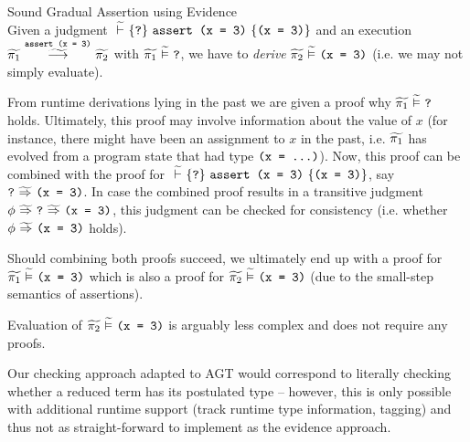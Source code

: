 \begin{example}{Sound Gradual Assertion using Evidence}\label{ex:snd-evidence}~\\
    Given a judgment $\gthoare{}{\qm}{\sAssert{\phiEq{x}{3}}}{\phiEq{x}{3}}$ and an execution $\gsstepConsume{\sAssert{\phiEq{x}{3}}}{\grad{\pi_1}}{\grad{\pi_2}}$ with $\evalgphiGen{\grad{\pi_1}}{\qm}$, we have to \emph{derive} $\evalgphiGen{\grad{\pi_2}}{\phiEq{x}{3}}$ (i.e. we may not simply evaluate).
    
    From runtime derivations lying in the past we are given a proof why $\evalgphiGen{\grad{\pi_1}}{\qm}$ holds.
    Ultimately, this proof may involve information about the value of $x$ (for instance, there might have been an assignment to $x$ in the past, i.e. $\grad{\pi_1}$ has evolved from a program state that had type $\phiEq{x}{...}$).
    Now, this proof can be combined with the proof for $\gthoare{}{\qm}{\sAssert{\phiEq{x}{3}}}{\phiEq{x}{3}}$, say $\gphiImplies{\qm}{\phiEq{x}{3}}$.
    In case the combined proof results in a transitive judgment $\gphiImplies{\phi}{\gphiImplies{\qm}{\phiEq{x}{3}}}$, this judgment can be checked for consistency (i.e. whether $\gphiImplies{\phi}{\phiEq{x}{3}}$ holds).
    
    Should combining both proofs succeed, we ultimately end up with a proof for $\evalgphiGen{\grad{\pi_1}}{\phiEq{x}{3}}$ which is also a proof for $\evalgphiGen{\grad{\pi_2}}{\phiEq{x}{3}}$ (due to the small-step semantics of assertions).
    
    Evaluation of $\evalgphiGen{\grad{\pi_2}}{\phiEq{x}{3}}$ is arguably less complex and does not require any proofs.
    \begin{comment}
    Note also that the assertion example above is a very simple case. In general, it might be required to show consistency of more complex proofs, e.g. by proving that $$\gphiImplies{\phiAnd{$(\phiAnd{$(\wo{\phi}{\eresult})$}{\phiEq{\eresult}{\ethis}})[\ttt{x},\ttt{y}/\eresult,\ethis]$}{\phiEq{x}{p}}}{\phiEq{y}{p}}$$
    holds given $$\gphiImplies{\phiAnd{$(\phiAnd{$(\wo{\phi}{\eresult})$}{\phiEq{\eresult}{\ethis}})[\ttt{x},\ttt{y}/\eresult,\ethis]$}{\phiEq{x}{p}}}{\phiEq{y}{p}}$$
    , which requires evidence sophisticated enough to model the program environment.
    \end{comment}
\end{example}

Our checking approach adapted to AGT would correspond to literally checking whether a reduced term has its postulated type -- however, this is only possible with additional runtime support (track runtime type information, tagging) and thus not as straight-forward to implement as the evidence approach.

